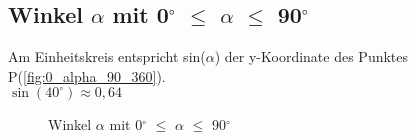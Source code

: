 \documentclass{standalone}
\begin{document}
\subsection{Winkel $\alpha$ mit 0$^\circ$  $\leq$ $\alpha$ $\leq$ 90$^\circ$ }
Am Einheitskreis entspricht sin($\alpha$) der y-Koordinate des Punktes P(\autoref{fig:0_alpha_90_360}).\\
\textbf{$\sin(40^\circ ) \approx 0,64$}

\begin{figure}[hb!]
  \center
  \def\svgwidth{200px}
  
  \caption{Winkel $\alpha$ mit 0$^\circ$  $\leq$ $\alpha$ $\leq$ 90$^\circ$ }
  \label{fig:0_alpha_90_360}
\end{figure}
\end{document}
